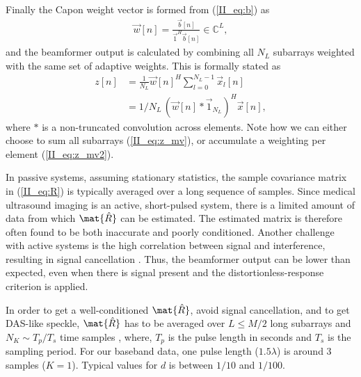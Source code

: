 Finally the Capon weight vector is formed from (\ref{II_eq:b}) as
%
\begin{align}\label{II_eq:w}
\vec{w}[n] = \frac{\vec{b}[n]}{\vec{1}^H\vec{b}[n]} \in \mathbb{C}^L,
\end{align}
%
and the beamformer output is calculated by combining all $N_L$ subarrays weighted with the same set of adaptive weights. This is formally stated as
%
\begin{align}
z[n] &= \frac{1}{N_L}\vec{w}[n]^H \sum_{l=0}^{N_L-1} \vec{x}_l[n] \label{II_eq:z_mv}\\
&= 1/N_L \, (\vec{w}[n] * \vec{1}_{N_L})^H\vec{x}[n] \label{II_eq:z_mv2},
\end{align}
where $*$ is a non-truncated convolution across elements.
Note how we can either choose to sum all subarrays (\ref{II_eq:z_mv}), or accumulate a weighting per element (\ref{II_eq:z_mv2}).

In passive systems, assuming stationary statistics, the sample covariance matrix in (\ref{II_eq:R}) is typically averaged over a long sequence of samples\cite{Krim1996}. Since medical ultrasound imaging is an active, short-pulsed system, there is a limited amount of data from which $\mat{\hat{R}}$ can be estimated. The estimated matrix is therefore often found to be both inaccurate and poorly conditioned. Another challenge with active systems is the high correlation between signal and interference, resulting in signal cancellation \cite{Reddy1987}. Thus, the beamformer output can be lower than expected, even when there is signal present and the distortionless-response criterion is applied. 

In order to get a well-conditioned $\mat{\hat{R}}$, avoid signal cancellation, and to get DAS-like speckle, $\mat{\hat{R}}$ has to be averaged over $L\le M/2$ long subarrays and $N_K \sim T_p/T_s$ time samples \cite{Synnevag2007a}, where, $T_p$ is the pulse length in seconds and $T_s$ is the sampling period. For our baseband data, one pulse length ($1.5\lambda$) is around 3 samples ($K=1$). Typical values for $d$ is between $1/10$ and $1/100$.

